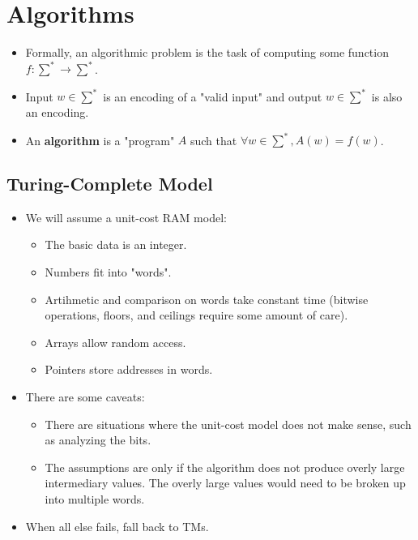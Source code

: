 \documentclass[12pt]{article}
\date{March 2, 2021}
\begin{document}
\maketitle

\section{Algorithms}
\begin{itemize}
    \item Formally, an algorithmic problem is the task of computing some function $f: \sum^{\ast} \rightarrow \sum^{\ast}$.
    \item Input $w \in \sum^{\ast}$ is an encoding of a "valid input" and output $w \in \sum^{\ast}$ is also an encoding.
    \item An \textbf{algorithm} is a "program" $A$ such that $\forall w \in \sum^{\ast}, A(w) = f(w)$.
\end{itemize}

\subsection{Turing-Complete Model}
\begin{itemize}
    \item We will assume a unit-cost RAM model:
    \begin{itemize}
        \item The basic data is an integer.
        \item Numbers fit into "words".
        \item Artihmetic and comparison on words take constant time (bitwise operations, floors, and ceilings require some amount of care).
        \item Arrays allow random access.
        \item Pointers store addresses in words.
    \end{itemize}
    \item There are some caveats:
    \begin{itemize}
        \item There are situations where the unit-cost model does not make sense, such as analyzing the bits.
        \item The assumptions are only if the algorithm does not produce overly large intermediary values. The overly large values would need to be broken up into multiple words.
    \end{itemize}
    \item When all else fails, fall back to TMs.
\end{itemize}
\end{document}
